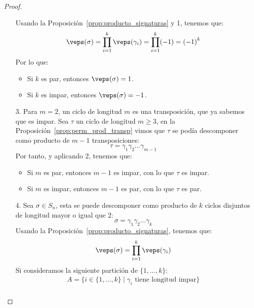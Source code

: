 \begin{prop}
\begin{proof}
\begin{enumerate}
                Usando la Proposición~\ref{prop:producto_signaturas} y 1, tenemos que:
                \begin{equation*}
                    \veps(\sigma) = \prod_{i=1}^{k}\veps(\gamma_i) = \prod_{i=1}^{k}(-1) = {(-1)}^{k}
                \end{equation*}
                Por lo que:
                \begin{itemize}
                    \item Si $k$ es par, entonces $\veps(\sigma)=1$.
                    \item Si $k$ es impar, entonces $\veps(\sigma)=-1$.
                \end{itemize}
            \item[3.] Para $m=2$, un ciclo de longitud $m$ es una transposición, que ya sabemos que es impar. Sea $\tau$ un ciclo de longitud $m\geq 3$, en la Proposición~\ref{prop:perm_prod_transp} vimos que $\tau$ se podía descomponer como producto de $m-1$ transposiciones:
                \begin{equation*}
                    \tau = \gamma_1\gamma_2\ldots \gamma_{m-1}
                \end{equation*}
                Por tanto, y aplicando 2, tenemos que:
                \begin{itemize}
                    \item Si $m$ es par, entonces $m-1$ es impar, con lo que $\tau$ es impar.
                    \item Si $m$ es impar, entonces $m-1$ es par, con lo que $\tau$ es par.
                \end{itemize}
            \item[4.] Sea $\sigma\in S_n$, esta se puede descomponer como producto de $k$ ciclos disjuntos de longitud mayor o igual que 2:
                \begin{equation*}
                    \sigma = \gamma_1\gamma_2 \ldots \gamma_k
                \end{equation*}
                Usando la Proposición~\ref{prop:producto_signaturas}, tenemos que:
                \begin{equation*}
                    \veps(\sigma) = \prod_{i=1}^{k}\veps(\gamma_i)
                \end{equation*}
                Si consideramos la siguiente partición de $\{1,\ldots,k\}$:
                \begin{gather*}
                    A = \{i \in \{1,\ldots,k\} \mid \gamma_i \text{\ tiene longitud impar}\} \\

\end{gather*}
\end{enumerate}
\end{proof}
\end{prop}

